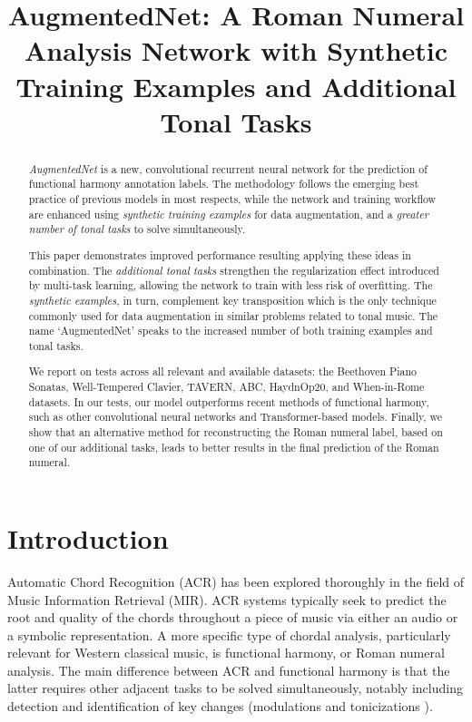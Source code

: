 \documentclass{article}
\title{AugmentedNet: A Roman Numeral Analysis Network with Synthetic Training Examples and Additional Tonal Tasks}
\newcommand{\guide}[1]{}
\begin{document}
%
\maketitle
%
\begin{abstract}

\textit{AugmentedNet} is a new, convolutional recurrent neural network for the prediction of functional harmony annotation labels.
The methodology follows the emerging best practice of previous models in most respects, while the network and training workflow are enhanced using \textit{synthetic training examples} for data augmentation, and a \textit{greater number of tonal tasks} to solve simultaneously.

This paper demonstrates improved performance resulting applying these ideas in combination.
The \textit{additional tonal tasks} strengthen the regularization effect introduced by multi-task learning, allowing the network to train with less risk of overfitting. 
The \textit{synthetic examples}, in turn, complement key transposition which is the only technique commonly used for data augmentation in similar problems related to tonal music.
The name `AugmentedNet' speaks to the increased number of both training examples and tonal tasks.

We report on tests across all relevant and available datasets: the Beethoven Piano Sonatas, Well-Tempered Clavier, TAVERN, ABC, HaydnOp20, and When-in-Rome datasets.
In our tests, our model outperforms recent methods of functional harmony, such as other convolutional neural networks and Transformer-based models.
Finally, we show that an alternative method for reconstructing the Roman numeral label, based on one of our additional tasks, leads to better results in the final prediction of the Roman numeral.
\end{abstract}
%
\section{Introduction}\label{sec:introduction}

\guide{RNA versus chord recognition.}
Automatic Chord Recognition (ACR) has been explored thoroughly in the field of Music Information Retrieval (MIR). 
ACR systems typically seek to predict the root and quality of the chords throughout a piece of music via either an audio or a symbolic representation.
A more specific type of chordal analysis, particularly relevant for Western classical music, is functional harmony, or Roman numeral analysis. 
The main difference between ACR and functional harmony is that the latter requires other adjacent tasks to be solved simultaneously, notably including detection and identification of key changes (modulations \cite{feisthauer_estimating_2020, schreiber_local_2020} and tonicizations \cite{napoles_lopez_local_2020}).
\end{document}

